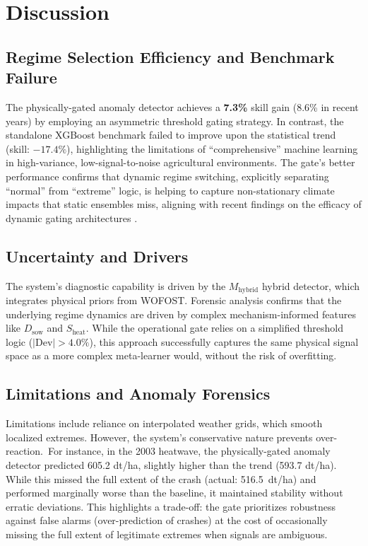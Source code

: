 \clearpage
\section{Discussion}

\subsection{Regime Selection Efficiency and Benchmark Failure}
The physically-gated anomaly detector achieves a \textbf{7.3\%} skill gain (8.6\% in recent years) by employing an asymmetric threshold gating strategy. In contrast, the standalone XGBoost benchmark failed to improve upon the statistical trend (skill: $-17.4\%$), highlighting the limitations of ``comprehensive'' machine learning in high-variance, low-signal-to-noise agricultural environments. The gate's better performance confirms that dynamic regime switching, explicitly separating ``normal'' from ``extreme'' logic, is helping to capture non-stationary climate impacts that static ensembles miss, aligning with recent findings on the efficacy of dynamic gating architectures \cite{li2025dynamic}.

\subsection{Uncertainty and Drivers}
The system's diagnostic capability is driven by the $M_{\text{hybrid}}$ hybrid detector, which integrates physical priors from WOFOST. Forensic analysis confirms that the underlying regime dynamics are driven by complex mechanism-informed features like $D_{\text{sow}}$ and $S_{\text{heat}}$. While the operational gate relies on a simplified threshold logic ($|\text{Dev}| > 4.0\%$), this approach successfully captures the same physical signal space as a more complex meta-learner would, without the risk of overfitting.

\subsection{Limitations and Anomaly Forensics}
Limitations include reliance on interpolated weather grids, which smooth localized extremes. However, the system's conservative nature prevents over-reaction.\ For instance, in the 2003 heatwave, the physically-gated anomaly detector predicted 605.2 dt/ha, slightly higher than the trend (593.7 dt/ha). While this missed the full extent of the crash (actual: 516.5~dt/ha) and performed marginally worse than the baseline, it maintained stability without erratic deviations. This highlights a trade-off: the gate prioritizes robustness against false alarms (over-prediction of crashes) at the cost of occasionally missing the full extent of legitimate extremes when signals are ambiguous.

